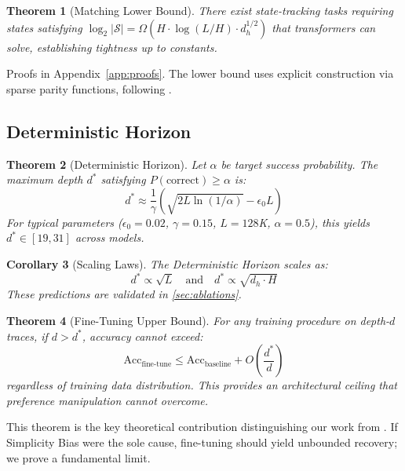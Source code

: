 \documentclass{article}
\theoremstyle{plain}
\newtheorem{theorem}{Theorem}[section]
\newtheorem{corollary}[theorem]{Corollary}
\theoremstyle{definition}
\theoremstyle{remark}
\begin{document}
\begin{theorem}[Matching Lower Bound]
\label{thm:lower}
There exist state-tracking tasks requiring states satisfying $\log_2|\mathcal{S}| = \Omega(H \cdot \log(L/H) \cdot d_h^{1/2})$ that transformers can solve, establishing tightness up to constants.
\end{theorem}

Proofs in Appendix~\ref{app:proofs}. The lower bound uses explicit construction via sparse parity functions, following \citet{sanford2024representational}.

\subsection{Deterministic Horizon}

\begin{theorem}[Deterministic Horizon]
\label{thm:horizon}
Let $\alpha$ be target success probability. The maximum depth $d^*$ satisfying $P(\text{correct}) \geq \alpha$ is:
\begin{equation}
d^* \approx \frac{1}{\gamma}\left(\sqrt{2L \ln(1/\alpha)} - \epsilon_0 L\right)
\end{equation}
For typical parameters ($\epsilon_0 = 0.02$, $\gamma = 0.15$, $L = 128$K, $\alpha = 0.5$), this yields $d^* \in [19, 31]$ across models.
\end{theorem}

\begin{corollary}[Scaling Laws]
\label{cor:scaling}
The Deterministic Horizon scales as:
\begin{equation}
d^* \propto \sqrt{L} \quad \text{and} \quad d^* \propto \sqrt{d_h \cdot H}
\end{equation}
These predictions are validated in \cref{sec:ablations}.
\end{corollary}

\begin{theorem}[Fine-Tuning Upper Bound]
\label{thm:finetune}
For any training procedure on depth-$d$ traces, if $d > d^*$, accuracy cannot exceed:
\begin{equation}
\text{Acc}_{\text{fine-tune}} \leq \text{Acc}_{\text{baseline}} + O\left(\frac{d^*}{d}\right)
\end{equation}
regardless of training data distribution. This provides an \emph{architectural ceiling} that preference manipulation cannot overcome.
\end{theorem}

This theorem is the key theoretical contribution distinguishing our work from \citet{wu2025more}. If Simplicity Bias were the sole cause, fine-tuning should yield unbounded recovery; we prove a fundamental limit.
\end{document}
